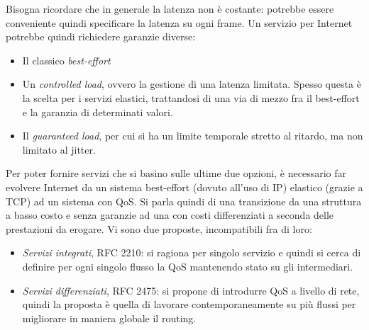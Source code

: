 Bisogna ricordare che in generale la latenza non è costante: potrebbe essere
conveniente quindi specificare la latenza su ogni frame. Un servizio per
Internet potrebbe quindi richiedere garanzie diverse:
\begin{itemize}
 \item Il classico \textit{best-effort}
 \item Un \textit{controlled load}, ovvero la gestione di una latenza limitata.
Spesso questa è la scelta per i
 servizi elastici, trattandosi di una via di mezzo fra il best-effort e la
garanzia di determinati valori.
 \item Il \textit{guaranteed load}, per cui si ha un limite temporale stretto al
ritardo, ma non limitato al jitter.
\end{itemize}
Per poter fornire servizi che si basino sulle ultime due opzioni, è necessario
far evolvere Internet da un sistema
best-effort (dovuto all'uso di IP) elastico (grazie a TCP) ad un sistema con
QoS. Si parla quindi di una transizione
da una struttura a basso costo e senza garanzie ad una con costi differenziati a
seconda delle prestazioni da erogare.
Vi sono due proposte, incompatibili fra di loro:
\begin{itemize}
 \item \textit{Servizi integrati}, RFC 2210: si ragiona per singolo servizio e
quindi si cerca di definire per ogni
 singolo flusso la QoS mantenendo stato su gli intermediari.
 \item \textit{Servizi differenziati}, RFC 2475: si propone di introdurre QoS a
livello di rete, quindi la proposta è
 quella di lavorare contemporaneamente su più flussi per migliorare in maniera
globale il routing.
\end{itemize}

